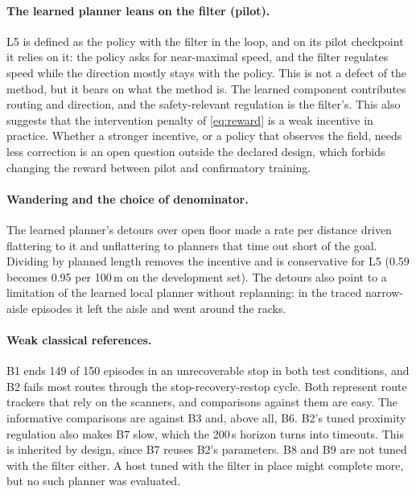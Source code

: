 \documentclass[11pt]{article}
\theoremstyle{definition}
\begin{document}
\paragraph{The learned planner leans on the filter (pilot).} L5 is defined as the policy with the filter in the
loop, and on its pilot checkpoint it relies on it: the policy asks for near-maximal speed, and the filter regulates speed
while the direction mostly stays with the policy. This is not a defect of the method, but it bears on what the method is.
The learned component contributes routing and direction, and the safety-relevant regulation is the filter's. This also
suggests that the intervention penalty of \eqref{eq:reward} is a weak incentive in practice. Whether a stronger
incentive, or a policy that observes the field, needs less correction is an open question outside the declared
design, which forbids changing the reward between pilot and confirmatory training.

\paragraph{Wandering and the choice of denominator.} The learned planner's detours over open floor made a
rate per distance driven flattering to it and unflattering to planners that time out short of the goal.
Dividing by planned length removes the incentive and is conservative for L5 (0.59 becomes 0.95 per
100\,m on the development set). The detours also point to a limitation of the learned local planner without
replanning: in the traced narrow-aisle episodes it left the aisle and went around the racks.

\paragraph{Weak classical references.} B1 ends 149 of 150 episodes in an unrecoverable stop in both test conditions,
and B2 fails most routes through the stop-recovery-restop cycle. Both represent route trackers that rely on the
scanners, and comparisons against them are easy. The informative comparisons are against B3 and, above all, B6. B2's
tuned proximity regulation also makes B7 slow, which the 200\,s horizon turns into timeouts. This is inherited by
design, since B7 reuses B2's parameters. B8 and B9 are not tuned with the filter either. A host tuned with the filter in
place might complete more, but no such planner was evaluated.
\end{document}
